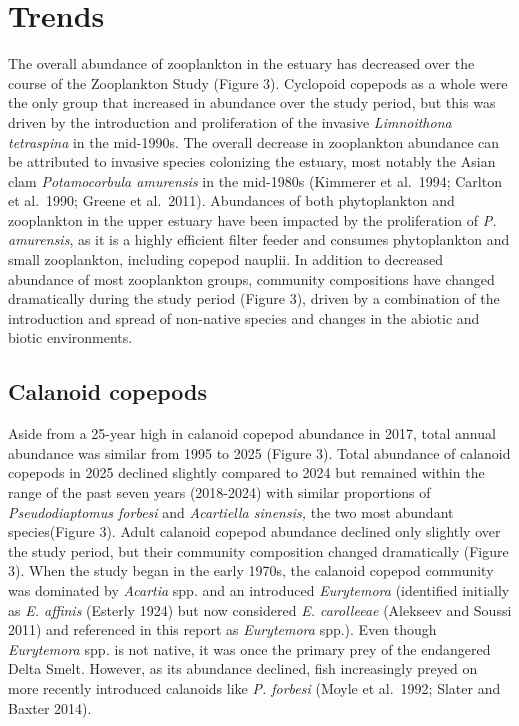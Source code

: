 \documentclass[
  letterpaper,
]{article}
\begin{document}
\section{Trends}\label{trends}

The overall abundance of zooplankton in the estuary has decreased over
the course of the Zooplankton Study (Figure 3). Cyclopoid copepods as a
whole were the only group that increased in abundance over the study
period, but this was driven by the introduction and proliferation of the
invasive \emph{Limnoithona tetraspina} in the mid-1990s. The overall
decrease in zooplankton abundance can be attributed to invasive species
colonizing the estuary, most notably the Asian clam \emph{Potamocorbula
amurensis} in the mid-1980s (Kimmerer et al.~1994; Carlton et al.~1990;
Greene et al.~2011). Abundances of both phytoplankton and zooplankton in
the upper estuary have been impacted by the proliferation of \emph{P.
amurensis}, as it is a highly efficient filter feeder and consumes
phytoplankton and small zooplankton, including copepod nauplii. In
addition to decreased abundance of most zooplankton groups, community
compositions have changed dramatically during the study period (Figure
3), driven by a combination of the introduction and spread of non-native
species and changes in the abiotic and biotic environments.

\subsection{Calanoid copepods}\label{calanoid-copepods}

Aside from a 25-year high in calanoid copepod abundance in 2017, total
annual abundance was similar from 1995 to 2025 (Figure 3). Total
abundance of calanoid copepods in 2025 declined slightly compared to
2024 but remained within the range of the past seven years (2018-2024)
with similar proportions of \emph{Pseudodiaptomus forbesi} and
\emph{Acartiella sinensis,} the two most abundant species(Figure 3).
Adult calanoid copepod abundance declined only slightly over the study
period, but their community composition changed dramatically (Figure 3).
When the study began in the early 1970s, the calanoid copepod community
was dominated by \emph{Acartia} spp. and an introduced \emph{Eurytemora}
(identified initially as \emph{E. affinis} (Esterly 1924) but now
considered \emph{E. carolleeae} (Alekseev and Soussi 2011) and
referenced in this report as \emph{Eurytemora} spp.). Even though
\emph{Eurytemora} spp\emph{.} is not native, it was once the primary
prey of the endangered Delta Smelt. However, as its abundance declined,
fish increasingly preyed on more recently introduced calanoids like
\emph{P. forbesi} (Moyle et al.~1992; Slater and Baxter 2014).
\end{document}
